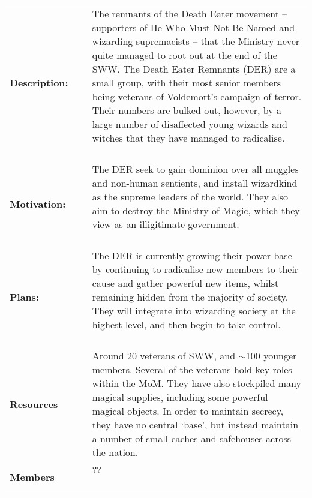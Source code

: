 \documentclass[oneside]{book}
\def\apos{'}
\begin{document}
\begin{longtable}{p{} p{} p{} }

\bf Description: & ~ &\parbox[t]{\q cm}{The remnants of the Death Eater movement -- supporters of He-Who-Must-Not-Be-Named and wizarding supremacists -- that the Ministry never quite managed to root out at the end of the SWW.   The Death Eater Remnants (DER) are a small group, with their most senior members being veterans of Voldemort{\apos}s campaign of terror.  Their numbers are bulked out, however, by a large number of disaffected young wizards and witches that they have managed to radicalise. \\~  } 
\\
\bf Motivation:	& ~ & \parbox[t]{\q cm}{ The DER seek to gain dominion over all muggles and non-human sentients, and install wizardkind as the supreme leaders of the world. They also aim to destroy the Ministry of Magic, which they view as an illigitimate government. \\~  } 
\\
\bf Plans:	& ~ & \parbox[t]{\q cm}{The DER is currently growing their power base by continuing to radicalise new members to their cause and gather powerful new items, whilst remaining hidden from the majority of society. They will integrate into wizarding society at the highest level, and then begin to take control. \\~  } 
\\
\bf Resources & ~ & \parbox[t]{\q cm}{Around 20 veterans of SWW, and $\sim$100 younger members. Several of the veterans hold key roles within the MoM. They have also stockpiled many magical supplies, including some powerful magical objects. In order to maintain secrecy, they have no central `base', but instead maintain a number of small caches and safehouses across the nation. \\ ~ }
\\
\bf Members	& ~ &  \parbox[t]{\q cm}{ ?? \\ ~ }

\end{longtable}
\end{document}
